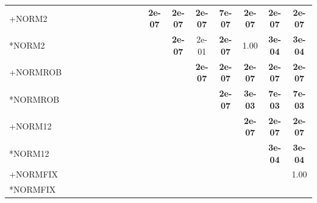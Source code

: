 \begin{table}[t]
{\begin{tabular}{lcccccccccccccccc}
+NORM2 &  &  &  &  &  &  &  &  &  & \textbf{2e-07} & \textbf{2e-07} & \textbf{2e-07} & \textbf{7e-07} & \textbf{2e-07} & \textbf{2e-07} & \textbf{2e-07} \\
*NORM2 &  &  &  &  &  &  &  &  &  &  & \textbf{2e-07} & 2e-01 & \textbf{2e-07} & 1.00 & \textbf{3e-04} & \textbf{3e-04} \\
+NORMROB &  &  &  &  &  &  &  &  &  &  &  & \textbf{2e-07} & \textbf{2e-07} & \textbf{2e-07} & \textbf{2e-07} & \textbf{2e-07} \\
*NORMROB &  &  &  &  &  &  &  &  &  &  &  &  & \textbf{2e-07} & \textbf{3e-03} & \textbf{7e-03} & \textbf{7e-03} \\
+NORM12 &  &  &  &  &  &  &  &  &  &  &  &  &  & \textbf{2e-07} & \textbf{2e-07} & \textbf{2e-07} \\
*NORM12 &  &  &  &  &  &  &  &  &  &  &  &  &  &  & \textbf{3e-04} & \textbf{3e-04} \\
+NORMFIX &  &  &  &  &  &  &  &  &  &  &  &  &  &  &  & 1.00 \\
*NORMFIX &  &  &  &  &  &  &  &  &  &  &  &  &  &  &  &  \\
\bottomrule
\end{tabular}
}
\end{table}

